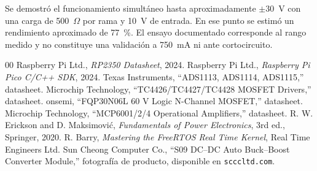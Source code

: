 \documentclass[conference]{IEEEtran}
\begin{document}
Se demostró el funcionamiento simultáneo hasta aproximadamente $\pm30$~V con una carga de 500~$\Omega$ por rama y 10~V de entrada. En ese punto se estimó un rendimiento aproximado de 77~\%. El ensayo documentado corresponde al rango medido y no constituye una validación a 750~mA ni ante cortocircuito.

\begin{thebibliography}{00}
 Raspberry Pi Ltd., \textit{RP2350 Datasheet}, 2024.
 Raspberry Pi Ltd., \textit{Raspberry Pi Pico C/C++ SDK}, 2024.
 Texas Instruments, ``ADS1113, ADS1114, ADS1115,'' datasheet.
 Microchip Technology, ``TC4426/TC4427/TC4428 MOSFET Drivers,'' datasheet.
 onsemi, ``FQP30N06L 60 V Logic N-Channel MOSFET,'' datasheet.
 Microchip Technology, ``MCP6001/2/4 Operational Amplifiers,'' datasheet.
 R. W. Erickson and D. Maksimovi\'c, \textit{Fundamentals of Power Electronics}, 3rd ed., Springer, 2020.
 R. Barry, \textit{Mastering the FreeRTOS Real Time Kernel}, Real Time Engineers Ltd.
 Sun Cheong Computer Co., ``S09 DC--DC Auto Buck--Boost Converter Module,'' fotografía de producto, disponible en \texttt{scccltd.com}.
\end{thebibliography}

\onecolumn
\appendices
\clearpage
\end{document}

